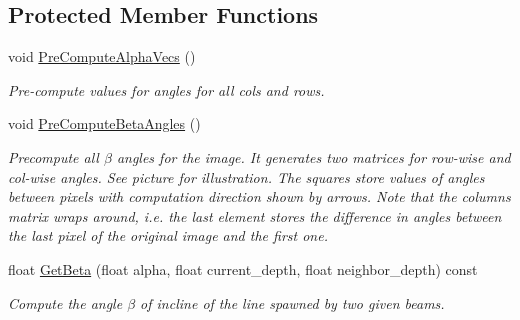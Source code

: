 \subsection*{Protected Member Functions}
\begin{DoxyCompactItemize}
\item 
\mbox{\label{classdepth__clustering_1_1AngleDiffPrecomputed_a8f333b5196e9dcaa7923f82d362c7281}} 
void \hyperlink{classdepth__clustering_1_1AngleDiffPrecomputed_a8f333b5196e9dcaa7923f82d362c7281}{Pre\+Compute\+Alpha\+Vecs} ()
\begin{DoxyCompactList}\small\item\em Pre-\/compute values for angles for all cols and rows. \end{DoxyCompactList}\item 
void \hyperlink{classdepth__clustering_1_1AngleDiffPrecomputed_aeb86ee61c6e8fc1b5b554368b1f5fa27}{Pre\+Compute\+Beta\+Angles} ()
\begin{DoxyCompactList}\small\item\em Precompute all $\beta$ angles for the image. It generates two matrices for row-\/wise and col-\/wise angles. See picture for illustration. The squares store values of angles between pixels with computation direction shown by arrows. Note that the columns matrix wraps around, i.\+e. the last element stores the difference in angles between the last pixel of the original image and the first one. \end{DoxyCompactList}\item 
float \hyperlink{classdepth__clustering_1_1AngleDiffPrecomputed_aa67b440539cd571a990af5131a5b1ec0}{Get\+Beta} (float alpha, float current\+\_\+depth, float neighbor\+\_\+depth) const
\begin{DoxyCompactList}\small\item\em Compute the angle $\beta$ of incline of the line spawned by two given beams. \end{DoxyCompactList}\end{DoxyCompactItemize}
